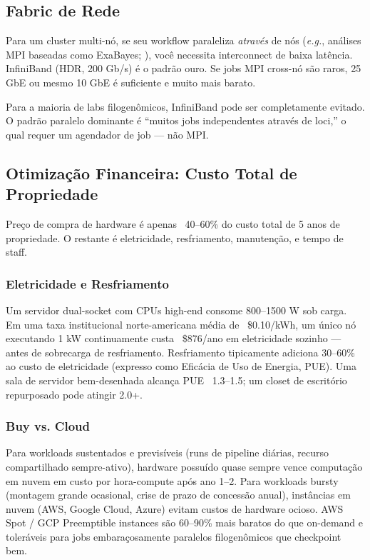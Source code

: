 \subsection{Fabric de Rede}

Para um cluster multi-nó, se seu workflow paraleliza \textit{através} de nós (\textit{e.g.}, análises MPI baseadas como ExaBayes; \textcite{aberer2014}), você necessita interconnect de baixa latência. InfiniBand (HDR, 200 Gb/s) é o padrão ouro. Se jobs MPI cross-nó são raros, 25 GbE ou mesmo 10 GbE é suficiente e muito mais barato.

Para a maioria de labs filogenômicos, InfiniBand pode ser completamente evitado. O padrão paralelo dominante é ``muitos jobs independentes através de loci,'' o qual requer um agendador de job --- não MPI.

\subsection{Otimização Financeira: Custo Total de Propriedade}

Preço de compra de hardware é apenas ~40--60\% do custo total de 5 anos de propriedade. O restante é eletricidade, resfriamento, manutenção, e tempo de staff.

\subsubsection{Eletricidade e Resfriamento}

Um servidor dual-socket com CPUs high-end consome 800--1500 W sob carga. Em uma taxa institucional norte-americana média de ~\$0.10/kWh, um único nó executando 1 kW continuamente custa ~\$876/ano em eletricidade sozinho --- antes de sobrecarga de resfriamento. Resfriamento tipicamente adiciona 30--60\% ao custo de eletricidade (expresso como Eficácia de Uso de Energia, PUE). Uma sala de servidor bem-desenhada alcança PUE ~1.3--1.5; um closet de escritório repurposado pode atingir 2.0+.

\subsubsection{Buy vs. Cloud}

Para workloads sustentados e previsíveis (runs de pipeline diárias, recurso compartilhado sempre-ativo), hardware possuído quase sempre vence computação em nuvem em custo por hora-compute após ano 1--2. Para workloads bursty (montagem grande ocasional, crise de prazo de concessão anual), instâncias em nuvem (AWS, Google Cloud, Azure) evitam custos de hardware ocioso. AWS Spot / GCP Preemptible instances são 60--90\% mais baratos do que on-demand e toleráveis para jobs embaraçosamente paralelos filogenômicos que checkpoint bem.

